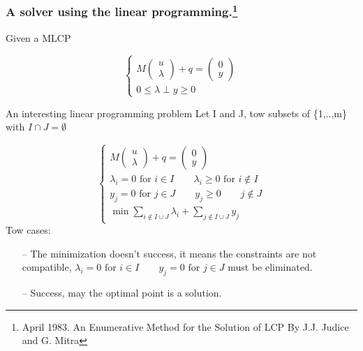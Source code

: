 
\frame
{
\frametitle{A solver using the linear programming.\footnote{April 1983. An Enumerative Method for the Solution
of LCP By J.J. Judice and G. Mitra}}
\begin{block}{ Given a MLCP}
 

\begin{equation}\label{eq:mlcp1}
 \begin{cases}
M \left(\begin{array}{c}
   u\\
   \lambda
   \end{array}\right) + q = \left(\begin{array}{c}
   0\\
   y
   \end{array}\right) \\
      0 \le \lambda \perp     y   \ge 0

      \end{cases}
\end{equation}


\end{block}

\begin{block}{An interesting linear programming problem}
Let I and J, tow subsets of \{1,..,m\} with  $I \cap J = \emptyset$

\begin{equation}\label{eq:mlcp1}
\begin{cases}
M \left(\begin{array}{c}
   u\\
   \lambda
   \end{array}\right) + q = \left(\begin{array}{c}
   0\\
   y
   \end{array}\right)\\
\lambda_i = 0 \textrm{ for } i \in I \qquad \lambda_i \ge 0 \textrm{ for } i \notin I\\
y_j = 0 \textrm{ for } j \in J \qquad y_j \ge 0 \qquad j \notin J\\
\min{\sum_{i\notin I\cup J} \lambda_i + \sum_{j\notin I\cup J} y_j}
\end{cases}
\end{equation}
Tow cases:\\
\begin{itemize}
 \item[--] The minimization doesn't success, it means the constraints are not compatible, $\lambda_i =0 \textrm{ for } i \in I \qquad y_j=0 \textrm{ for } j\in J$ must be eliminated.\\
\item[--]Success, may the optimal point is a solution.
\end{itemize}

\end{block}

}

